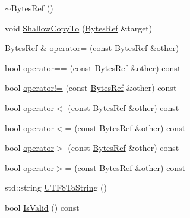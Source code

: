\begin{DoxyCompactItemize}
\item 
\mbox{\hyperlink{classlucene_1_1core_1_1util_1_1BytesRef_a7c9d7930ac1511839e4cd2f551e8a78a}{$\sim$\+Bytes\+Ref}} ()
\item 
void \mbox{\hyperlink{classlucene_1_1core_1_1util_1_1BytesRef_a2f75314d896984075dfd351b4d8e3e49}{Shallow\+Copy\+To}} (\mbox{\hyperlink{classlucene_1_1core_1_1util_1_1BytesRef}{Bytes\+Ref}} \&target)
\item 
\mbox{\hyperlink{classlucene_1_1core_1_1util_1_1BytesRef}{Bytes\+Ref}} \& \mbox{\hyperlink{classlucene_1_1core_1_1util_1_1BytesRef_a83163bf442814183adc151dccf70bc73}{operator=}} (const \mbox{\hyperlink{classlucene_1_1core_1_1util_1_1BytesRef}{Bytes\+Ref}} \&other)
\item 
bool \mbox{\hyperlink{classlucene_1_1core_1_1util_1_1BytesRef_a1f856405da2816cb3bf448507e296d97}{operator==}} (const \mbox{\hyperlink{classlucene_1_1core_1_1util_1_1BytesRef}{Bytes\+Ref}} \&other) const
\item 
bool \mbox{\hyperlink{classlucene_1_1core_1_1util_1_1BytesRef_a06c0da4f9479190bee2e32791531bbc9}{operator!=}} (const \mbox{\hyperlink{classlucene_1_1core_1_1util_1_1BytesRef}{Bytes\+Ref}} \&other) const
\item 
bool \mbox{\hyperlink{classlucene_1_1core_1_1util_1_1BytesRef_ae91fb3040f390277b694dbb706a04860}{operator$<$}} (const \mbox{\hyperlink{classlucene_1_1core_1_1util_1_1BytesRef}{Bytes\+Ref}} \&other) const
\item 
bool \mbox{\hyperlink{classlucene_1_1core_1_1util_1_1BytesRef_a819f7a557975f9a9145bf62c50a1fcee}{operator$<$=}} (const \mbox{\hyperlink{classlucene_1_1core_1_1util_1_1BytesRef}{Bytes\+Ref}} \&other) const
\item 
bool \mbox{\hyperlink{classlucene_1_1core_1_1util_1_1BytesRef_a4d526c1de9d527ddc8298117b94ef29d}{operator$>$}} (const \mbox{\hyperlink{classlucene_1_1core_1_1util_1_1BytesRef}{Bytes\+Ref}} \&other) const
\item 
bool \mbox{\hyperlink{classlucene_1_1core_1_1util_1_1BytesRef_a17482ef83c73168704b378a6c2e43e8f}{operator$>$=}} (const \mbox{\hyperlink{classlucene_1_1core_1_1util_1_1BytesRef}{Bytes\+Ref}} \&other) const
\item 
std\+::string \mbox{\hyperlink{classlucene_1_1core_1_1util_1_1BytesRef_ad5cf9964fc7ac5450ee4c38f18f046bb}{U\+T\+F8\+To\+String}} ()
\item 
bool \mbox{\hyperlink{classlucene_1_1core_1_1util_1_1BytesRef_aa1b9faf8ecc8285118b4cc63dd8d7d57}{Is\+Valid}} () const
\end{DoxyCompactItemize}
